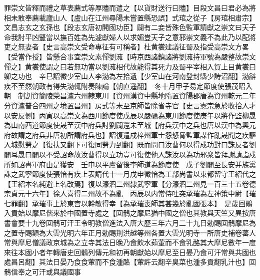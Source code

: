 罪崇文皆釋而禮之草表薦式等厚贐而遣之【以貨財送行曰贐】目段文昌曰君必為將相未敢奉薦載廬山人【盧山在江州尋陽未嘗置縣恐誤】式琯之從子【房琯相肅宗】文昌志玄之玄孫也【段志玄唐初開國功臣】闢有二妾皆殊色監軍請獻之崇文曰天子命我討平凶豎當以撫百姓為先遽獻婦人以求媚豈天子之意邪崇文義不為此乃以配將吏之無妻者【史言高崇文受命專征有可稱者】杜黄裳建議征蜀及指受高崇文方畧【受當作授】皆懸合事宜崇文素憚劉澭【時京西諸鎮諸將劉澭持軍號為嚴整故崇文憚之】黄裳使謂之曰若無功當以劉澭相代故能得其死力及蜀平宰相入賀上目黄裳曰卿之功也　辛巳詔徵少室山人李渤為左拾遺【少室山在河南登封縣少詩沼翻】渤辭疾不至然朝政有得失渤輒附奏陳論【朝直遥翻】　冬十月甲子易定節度使張茂昭入朝　制割資簡陵榮昌瀘六州隸東川【資州漢資中縣地隋置資陽郡唐為資州乾元二年分資瀘普合四州之境置昌州】房式等未至京師皆除省寺官【史言憲宗急於收拾人才以安反側】丙寅以高崇文為西川節度使戊辰以嚴礪為東川節度使庚午以將作監柳晟為山南西道節度使晟至漢中府兵討劉闢還未至城【府兵漢中之兵也唐以漢中為興元府故謂之府兵非唐初所謂府兵也】詔復遣戍梓州軍士怨怒脅監軍謀作亂晟聞之疾驅入城慰勞之【復扶又翻下可復同勞力到翻】既而問曰汝曹何以得成功對曰誅反者劉闢耳晟曰闢以不受詔命故汝曹得以立功豈可復使他人誅汝以為功邪衆皆拜謝請詣戍所如詔書軍府由是獲安　壬申以平盧留後李師道為節度使　戊子劉闢至長安并族黨誅之武寧節度使張愔有疾上表請代十一月戊申徵愔為工部尚書以東都留守王紹代之【王紹本名純避上名改焉】復以濠泗二州隸武寧軍【分濠泗二州見一百三十五卷德宗貞元十六年】徐人喜得二州故不為亂　丙辰以内常侍吐突承璀為左神策中尉【璀七罪翻】承璀事上於東宫以幹敏得幸【為承璀喪師其甚幾於亂國張本】　是歲回鶻入貢始以摩尼偕來於中國置寺處之【回鶻之摩尼猶中國之僧也其教與天竺又異按唐書會要十九卷回鶻可汗王令明教僧進法入唐大歷三年六月二十九日勅賜回鶻摩尼為之置寺賜額為大雲光明六年正月勅賜荆洪越等州各置大雲光明寺一所唐史補卷蕃人常與摩尼僧議政京城為之立寺其法日晚乃食飲水茹葷而不食乳酪其大摩尼數年一度來往本國小者年轉唐史回鶻列傳元和初再朝獻始以摩尼至日晏乃食可汗常與共國也處昌呂翻】其法日晏乃食食葷而不食湩酪【葷許云翻辛臭菜也湩多貢翻乳汁也】回鶻信奉之可汗或與議國事

